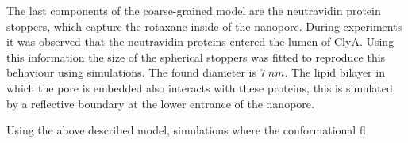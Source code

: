 The last components of the coarse-grained model are the neutravidin protein stoppers,
which capture the rotaxane inside of the nanopore. During experiments it was observed
that the neutravidin proteins entered the lumen of ClyA. Using this information the size
of the spherical stoppers was fitted to reproduce this behaviour using simulations. The
found diameter is $7\ nm$. The lipid bilayer in which the pore is embedded also interacts
with these proteins, this is simulated by a reflective boundary at the lower entrance of
the nanopore.

Using the above described model, simulations where the conformational fl




